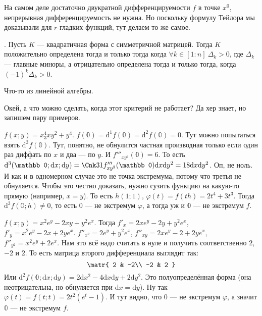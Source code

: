 \documentclass{article}
\begin{document}
\begin{itemize}
\begin{Proof}
        \end{Proof}
        \begin{Comment}
            На самом деле достаточно двукратной дифференцируемости $f$ в точке $x^0$, непрерывная дифференцируемость не нужна. Но поскольку формулу Тейлора мы доказывали для $r$-гладких функций, тут делаем то же самое.
        \end{Comment}
        \thm {}. Пусть $K$ --- квадратичная форма с симметричной матрицей. Тогда $K$ положительно определена тогда и только тогда когда $\forall k\in[1:n]~\Delta_k>0$, где $\Delta_k$ --- главные миноры, а отрицательно определена тогда и только тогда, когда $(-1)^k\Delta_k>0$.
        \begin{Proof}
            Что-то из линейной алгебры.
        \end{Proof}
        \begin{Comment}
            Окей, а что можно сделать, когда этот критерий не работает? Да хер знает, но запишем пару примеров.
        \end{Comment}
        \begin{Example}
            $f(x;y)=x^4_3xy^2+y^4$.
            $f(\mathbb0)=\mathrm d^1f(\mathbb0)=\mathrm d^2f(\mathbb0)=0$. Тут можно попытаться взять $\mathrm d^3f(\mathbb0)$. Тут, понятно, не обнулится частная производная только если один раз диффать по $x$ и два --- по $y$. И $f'''_{xy^2}(\mathbb0)=6$. То есть $\mathrm d^3(\mathbb0;\mathrm dx;\mathrm dy)=\Cnk31f'''_{xy^2}(\mathbb0)\mathrm dx\mathrm dy^2=18\mathrm dx\mathrm dy^2$. Оп, не ноль. И как и в одномерном случае это не точка экстремума, потому что третья не обнуляется. Чтобы это честно доказать, нужно сузить функцию на какую-то прямую (например, $x=y$). То есть $h(1;1)$, $\varphi(t)=f(th)=2t^4+3t^3$. Тогда $\mathrm d^3f(\mathbb0;h)\neq0$, то есть $0$ --- не экстремум $\varphi$, а тогда уж и $\mathbb0$ --- не экстремум $f$.
        \end{Example}
        \begin{Example}
            $f(x;y)=x^2e^y-2xy+y^2e^x$. Тогда $f'_x=2xe^y-2y+y^2e^x$, $f'_y=x^2e^y-2x+2ye^x$. $f''_{x^2}=2e^y+y^2e^x$, $f''_{xy}=2xe^y-2+2ye^x$, $f''_{y^2}=x^2e^y+2e^x$. Нам это всё надо считать в нуле и получить соответственно $2$, $-2$ и $2$. То есть матрица второго дифференциала выглядит так:
            \[\matr{
                2 & -2\\
                -2 & 2
            }\]
            Или $\mathrm d^2f(\mathbb0;\mathrm dx;\mathrm dy)=2\mathrm dx^2-4\mathrm dx\mathrm dy+2\mathrm dy^2$. Это полуопределённая форма (она неотрицательна, но обнуляется при $\mathrm dx=\mathrm dy$). Ну так $\varphi(t)=f(t;t)=2t^2(e^t-1)$. И тут видно, что $0$ --- не экстремум $\varphi$, а значит $\mathbb0$ --- не экстремум $f$.\\

\end{Example}
\end{itemize}
\end{document}
